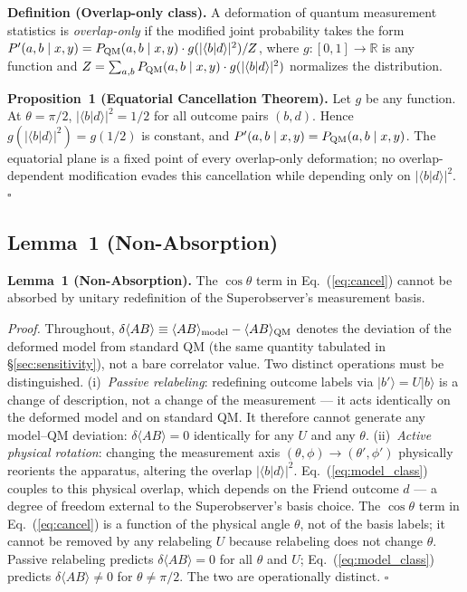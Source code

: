 \documentclass[twocolumn,aps,pra,superscriptaddress,floatfix,10pt]{revtex4-2}
\begin{document}
\textbf{Definition (Overlap-only class).} A deformation of quantum measurement
statistics is \emph{overlap-only} if the modified joint probability takes the form
$P'(a,b \mid x,y) = P_{\rm QM}(a,b \mid x,y) \cdot g(|\langle b|d\rangle|^2) / Z$, where
$g: [0,1] \to \mathbb{R}$ is any function and $Z = \sum_{a,b} P_{\rm QM}(a,b \mid x,y) \cdot g(|\langle b|d\rangle|^2)$
normalizes the distribution.

\textbf{Proposition~1 (Equatorial Cancellation Theorem).} Let $g$ be any function.
At $\theta = \pi/2$, $|\langle b|d\rangle|^2 = 1/2$ for all outcome pairs $(b,d)$. Hence
$g(|\langle b|d\rangle|^2) = g(1/2)$ is constant, and $P'(a,b \mid x,y) = P_{\rm QM}(a,b \mid x,y)$.
The equatorial plane is a fixed point of every overlap-only deformation;
no overlap-dependent modification evades this cancellation while depending
only on $|\langle b|d\rangle|^2$. $\square$

\subsection{Lemma~1 (Non-Absorption)}
\label{sec:lemma}

\textbf{Lemma~1 (Non-Absorption).} The $\cos\theta$ term in Eq.~(\ref{eq:cancel}) cannot be absorbed
by unitary redefinition of the Superobserver's measurement basis.

\emph{Proof.} Throughout, $\delta\langle AB\rangle \equiv \langle AB\rangle_{\rm model} - \langle AB\rangle_{\rm QM}$
denotes the deviation of the deformed model from standard QM (the same
quantity tabulated in \S\ref{sec:sensitivity}), not a bare correlator value.
Two distinct operations must be distinguished. (i)~\emph{Passive
relabeling}: redefining outcome labels via $|b'\rangle = U|b\rangle$ is a change
of description, not a change of the measurement --- it acts identically on the
deformed model and on standard QM. It therefore cannot generate any
model--QM deviation: $\delta\langle AB\rangle = 0$ identically for any
$U$ and any $\theta$. (ii)~\emph{Active physical rotation}: changing the measurement
axis $(\theta, \phi) \to (\theta', \phi')$ physically reorients the apparatus, altering the
overlap $|\langle b|d\rangle|^2$. Eq.~(\ref{eq:model_class}) couples to this physical overlap, which
depends on the Friend outcome $d$ --- a degree of freedom external to the
Superobserver's basis choice. The $\cos\theta$ term in Eq.~(\ref{eq:cancel}) is a function of
the physical angle $\theta$, not of the basis labels; it cannot be removed by
any relabeling $U$ because relabeling does not change $\theta$. Passive
relabeling predicts $\delta\langle AB\rangle = 0$ for all $\theta$ and $U$; Eq.~(\ref{eq:model_class}) predicts
$\delta\langle AB\rangle \neq 0$ for $\theta \neq \pi/2$. The two are operationally distinct. $\square$
\end{document}

